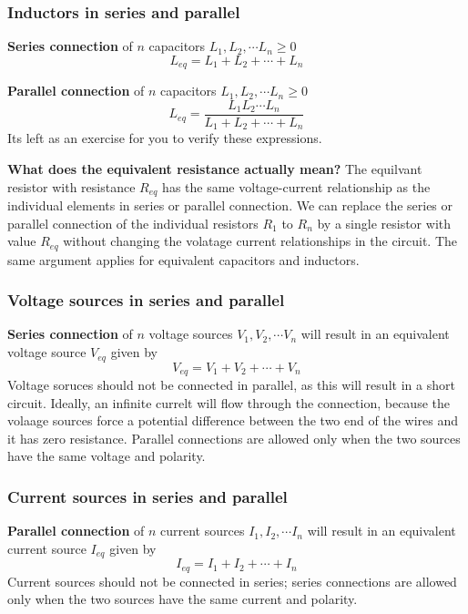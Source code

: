 \subsubsection{Inductors in series and parallel}
\noindent\textbf{Series connection} of $n$ capacitors $L_1, L_2, \cdots L_n \geq 0$
\begin{equation}
    L_{eq} = L_1 + L_2 + \cdots + L_n
    \label{eq:02-17}
\end{equation}

\noindent\textbf{Parallel connection} of $n$ capacitors $L_1, L_2, \cdots L_n \geq 0$
\begin{equation}
    L_{eq} = \frac{L_1L_2\cdots L_n}{L_1 + L_2 + \cdots + L_n}
    \label{eq:02-18}
\end{equation}
Its left as an exercise for you to verify these expressions.

\noindent\textbf{What does the equivalent resistance actually mean?} The equilvant resistor with resistance $R_{eq}$ has the same voltage-current relationship as the individual elements in series or parallel connection. We can replace the series or parallel connection of the individual resistors $R_1$ to $R_n$ by a single resistor with value $R_{eq}$ without changing the volatage current relationships in the circuit. The same argument applies for equivalent capacitors and inductors.

\subsubsection{Voltage sources in series and parallel}
\noindent\textbf{Series connection} of $n$ voltage sources $V_1, V_2, \cdots V_n$ will result in an equivalent voltage source $V_{eq}$ given by
\begin{equation}
    V_{eq} = V_1 + V_2 + \cdots + V_n
    \label{eq:02-19}
\end{equation}
Voltage soruces should not be connected in parallel, as this will result in a short circuit. Ideally, an infinite currelt will flow through the connection, because the volaage sources force a potential difference between the two end of the wires and it has zero resistance. Parallel connections are allowed only when the two sources have the same voltage and polarity.

\subsubsection{Current sources in series and parallel}
\noindent\textbf{Parallel connection} of $n$ current sources $I_1, I_2, \cdots I_n$ will
result in an equivalent current source $I_{eq}$ given by
\begin{equation}
    I_{eq} = I_1 + I_2 + \cdots + I_n
    \label{eq:02-20}
\end{equation}
Current sources should not be connected in series; series connections are allowed only when the two sources have the same current and polarity.

